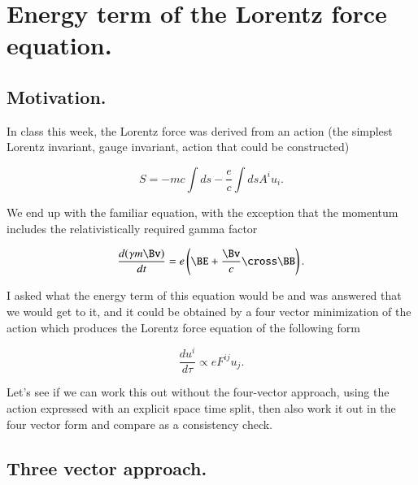 %
%

\chapter{Energy term of the Lorentz force equation.}
\label{chap:lorentzForceHamiltonian}
{}
\date{Feb 6, 2011}

\beginArtWithToc

\section{Motivation.}

In class this week, the Lorentz force was derived from an action (the simplest Lorentz invariant, gauge invariant, action that could be constructed)

\begin{equation}\label{eqn:lorentzForceHamiltonian:10}
S = - m c \int ds - \frac{e}{c} \int ds A^i u_i.
\end{equation}

We end up with the familiar equation, with the exception that the momentum includes the relativistically required gamma factor

\begin{equation}\label{eqn:lorentzForceHamiltonian:20}
\frac{d (\gamma m \Bv)}{dt} = e \left( \BE + \frac{\Bv}{c} \cross \BB \right).
\end{equation}

I asked what the energy term of this equation would be and was answered that we would get to it, and it could be obtained by a four vector minimization of the action which produces the Lorentz force equation of the following form

\begin{equation}\label{eqn:lorentzForceHamiltonian:30}
\frac{du^i}{d\tau} \propto e F^{ij} u_j.
\end{equation}

Let's see if we can work this out without the four-vector approach, using the action expressed with an explicit space time split, then also work it out in the four vector form and compare as a consistency check.

\section{Three vector approach.}
